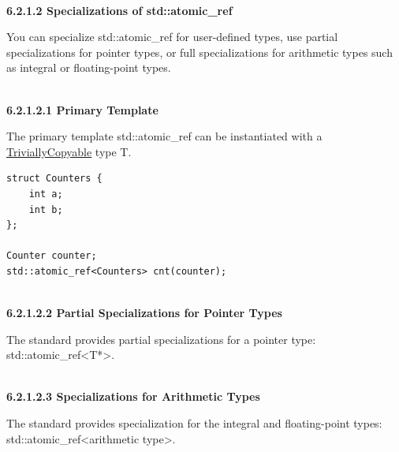 \hspace*{\fill} \\ %
\noindent
\textbf{6.2.1.2\hspace{0.2cm} Specializations of std::atomic\_ref}

You can specialize std::atomic\_ref for user-defined types, use partial specializations for pointer types, or full specializations for arithmetic types such as integral or floating-point types.

\hspace*{\fill} \\ %
\noindent
\textbf{6.2.1.2.1\hspace{0.2cm} Primary Template}

The primary template std::atomic\_ref can be instantiated with a \href{https://en.cppreference.com/w/cpp/types/is_trivially_copyable}{TriviallyCopyable} type T.

\begin{lstlisting}[style=styleCXX]
struct Counters {
	int a;
	int b;
};

Counter counter;
std::atomic_ref<Counters> cnt(counter);
\end{lstlisting}

\hspace*{\fill} \\ %
\noindent
\textbf{6.2.1.2.2\hspace{0.2cm} Partial Specializations for Pointer Types}

The standard provides partial specializations for a pointer type: std::atomic\_ref<T*>.

\hspace*{\fill} \\ %
\noindent
\textbf{6.2.1.2.3\hspace{0.2cm} Specializations for Arithmetic Types}

The standard provides specialization for the integral and floating-point types: std::atomic\_ref<arithmetic type>.

